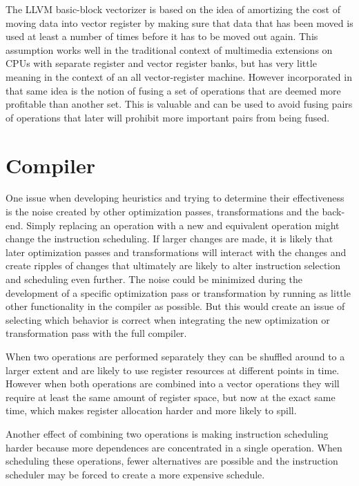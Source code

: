 \documentclass[12pt,a4paper,onecolumn,twoside,openright]{report}
\begin{document}
The LLVM basic-block vectorizer is based on the idea of amortizing the cost of moving data into vector register by making sure that data that has been moved is used at least a number of times before it has to be moved out again. This assumption works well in the traditional context of multimedia extensions on CPUs with separate register and vector register banks, but has very little meaning in the context of an all vector-register machine. However incorporated in that same idea is the notion of fusing a set of operations that are deemed more profitable than another set. This is valuable and can be used to avoid fusing pairs of operations that later will prohibit more important pairs from being fused.



\section{Compiler}
\label{sec:compiler}
One issue when developing heuristics and trying to determine their effectiveness is the noise created by other optimization passes, transformations and the back-end. Simply replacing an operation with a new and equivalent operation might change the instruction scheduling. If larger changes are made, it is likely that later optimization passes and transformations will interact with the changes and create ripples of changes that ultimately are likely to alter instruction selection and scheduling even further. The noise could be minimized during the development of a specific optimization pass or transformation by running as little other functionality in the compiler as possible. But this would create an issue of selecting which behavior is correct when integrating the new optimization or transformation pass with the full compiler.


When two operations are performed separately they can be shuffled around to a larger extent and are likely to use register resources at different points in time. However when both operations are combined into a vector operations they will require at least the same amount of register space, but now at the exact same time, which makes register allocation harder and more likely to spill.


Another effect of combining two operations is making instruction scheduling harder because more dependences are concentrated in a single operation. When scheduling these operations, fewer alternatives are possible and the instruction scheduler may be forced to create a more expensive schedule. 
\end{document}
